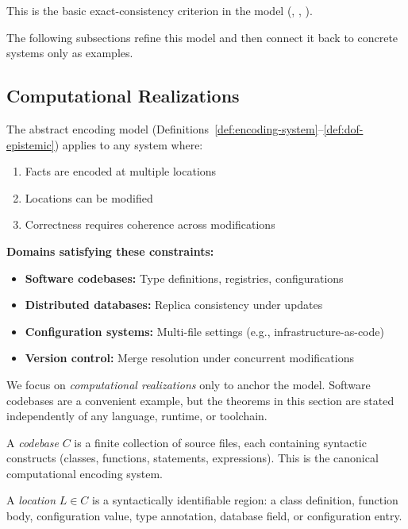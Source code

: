 This is the basic exact-consistency criterion in the model (, , ).

The following subsections refine this model and then connect it back to concrete systems only as examples.


\subsection{Computational Realizations}\label{sec:edit-space}

The abstract encoding model (Definitions~\ref{def:encoding-system}--\ref{def:dof-epistemic}) applies to any system where:
\begin{enumerate}
\tightlist
\item Facts are encoded at multiple locations
\item Locations can be modified
\item Correctness requires coherence across modifications
\end{enumerate}

\textbf{Domains satisfying these constraints:}
\begin{itemize}
\tightlist
\item \textbf{Software codebases:} Type definitions, registries, configurations
\item \textbf{Distributed databases:} Replica consistency under updates
\item \textbf{Configuration systems:} Multi-file settings (e.g., infrastructure-as-code)
\item \textbf{Version control:} Merge resolution under concurrent modifications
\end{itemize}

We focus on \emph{computational realizations} only to anchor the model. Software codebases are a convenient example, but the theorems in this section are stated independently of any language, runtime, or toolchain.

\begin{definition}
A \emph{codebase} $C$ is a finite collection of source files, each containing syntactic constructs (classes, functions, statements, expressions). This is the canonical computational encoding system.
\end{definition}

\begin{definition}[Location]
A \emph{location} $L \in C$ is a syntactically identifiable region: a class definition, function body, configuration value, type annotation, database field, or configuration entry.
\end{definition}

